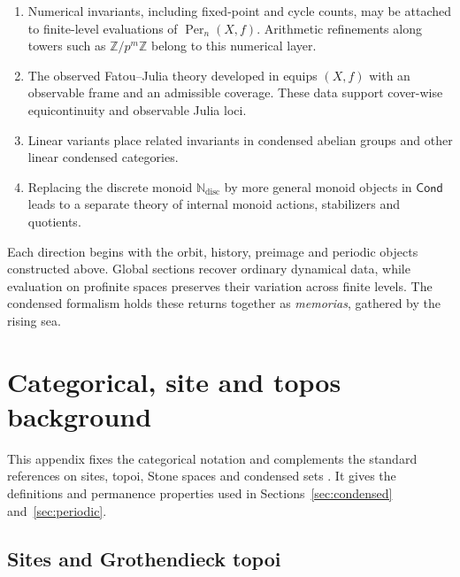 \documentclass[10pt]{amsart}
\newcommand{\Cond}{\mathsf{Cond}}
\newcommand{\Per}{\operatorname{Per}}
\newcommand{\Z}{\mathbb{Z}}
\newcommand{\Ndisc}{\mathbb{N}_{\mathrm{disc}}}
\theoremstyle{plain}
\theoremstyle{definition}
\begin{document}
\begin{enumerate}[label=(\roman*)]
\item Numerical invariants, including fixed-point and cycle counts, may be
attached to finite-level evaluations of $\Per_n(X,f)$. Arithmetic refinements
along towers such as $\Z/p^m\Z$ belong to this numerical layer.

\item The observed Fatou--Julia theory developed in
\cite{PerezBuendiaFatuTopos} equips $(X,f)$ with an observable frame and an
admissible coverage. These data support cover-wise equicontinuity and observable
Julia loci.

\item Linear variants place related invariants in condensed abelian groups and
other linear condensed categories.

\item Replacing the discrete monoid $\Ndisc$ by more general monoid objects
in $\Cond$ leads to a separate theory of internal monoid actions, stabilizers and
quotients.
\end{enumerate}

Each direction begins with the orbit, history, preimage and periodic objects
constructed above. Global sections recover ordinary dynamical data, while
evaluation on profinite spaces preserves their variation across finite levels.
The condensed formalism holds these returns together as \emph{memorias},
gathered by the rising sea.

\appendix

\section{Categorical, site and topos background}
\label{app:categorical-background}

This appendix fixes the categorical notation and complements the standard
references on sites, topoi, Stone spaces and condensed sets
\cite{MacLaneMoerdijk,JohnstoneTopos,JohnstoneStoneSpaces,ClausenScholze,LeStumCondensed}.
It gives the definitions and permanence properties used in
Sections~\ref{sec:condensed} and~\ref{sec:periodic}.

\subsection{Sites and Grothendieck topoi}
\end{document}
